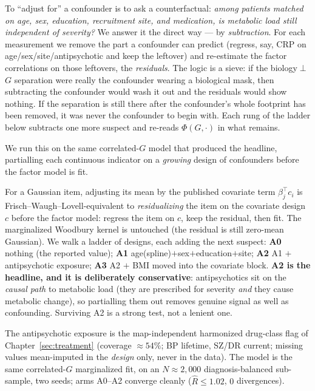 \begin{definitionbox}
To ``adjust for'' a confounder is to ask a counterfactual: \emph{among patients matched on age, sex, education,
recruitment site, and medication, is metabolic load still independent of severity?} We answer it the direct way
--- by \emph{subtraction}. For each measurement we remove the part a confounder can predict (regress, say, CRP
on age/sex/site/antipsychotic and keep the leftover) and re-estimate the factor correlations on those leftovers,
the \emph{residuals}. The logic is a sieve: if the biology$\perp$$G$ separation were really the confounder
wearing a biological mask, then subtracting the confounder would wash it out and the residuals would show
nothing. If the separation is still there after the confounder's whole footprint has been removed, it was never
the confounder to begin with. Each rung of the ladder below subtracts one more suspect and re-reads
$\Phi(G,\cdot)$ in what remains.
\end{definitionbox}

We run this on the same correlated-$G$ model that produced the headline, partialling each continuous indicator
on a \emph{growing} design of confounders before the factor model is fit.

\begin{methodsbox}
For a Gaussian item, adjusting its mean by the published covariate term $\beta_j^\top c_i$ is
Frisch--Waugh--Lovell-equivalent to \emph{residualizing} the item on the covariate design $c$ before the factor
model: regress the item on $c$, keep the residual, then fit. The marginalized Woodbury kernel is untouched (the
residual is still zero-mean Gaussian). We walk a ladder of designs, each adding the next suspect: \textbf{A0}
nothing (the reported value); \textbf{A1} age(spline)$+$sex$+$education$+$site; \textbf{A2} A1 $+$ antipsychotic
exposure; \textbf{A3} A2 $+$ BMI moved into the covariate block. \textbf{A2 is the headline, and it is
deliberately conservative}: antipsychotics sit on the \emph{causal path} to metabolic load (they are prescribed
for severity \emph{and} they cause metabolic change), so partialling them out removes genuine signal as well as
confounding. Surviving A2 is a strong test, not a lenient one.
\end{methodsbox}

The antipsychotic exposure is the map-independent harmonized drug-class flag of Chapter~\ref{sec:treatment}
(coverage $\approx54\%$; BP lifetime, SZ/DR current; missing values mean-imputed in the \emph{design} only, never
in the data). The model is the same correlated-$G$ marginalized fit, on an $N\approx2{,}000$ diagnosis-balanced
sub-sample, two seeds; arms A0--A2 converge cleanly ($\widehat{R}\le1.02$, $0$ divergences).

